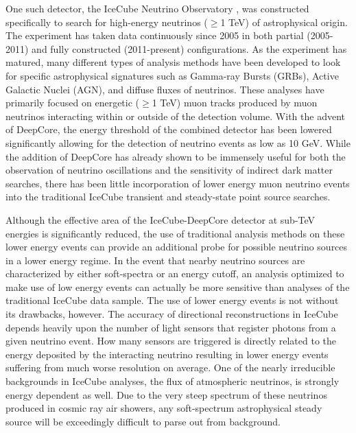 \documentclass{gatech-thesis}
\begin{document}
One such detector, the IceCube Neutrino Observatory \cite{2006APh....26..155I}, was constructed specifically to search for high-energy neutrinos ($\geq$1 TeV) of astrophysical origin. The experiment has taken data continuously since 2005 in both partial (2005-2011) and fully constructed (2011-present) configurations. As the experiment has matured, many different types of analysis methods have been developed to look for specific astrophysical signatures such as Gamma-ray Bursts (GRBs), Active Galactic Nuclei (AGN), and diffuse fluxes of neutrinos. These analyses have primarily focused on energetic ($\geq$1 TeV) muon tracks produced by muon neutrinos interacting within or outside of the detection volume. With the advent of DeepCore\cite{2012APh....35..615A}, the energy threshold of the combined detector has been lowered significantly allowing for the detection of neutrino events as low as 10 GeV. While the addition of DeepCore has already shown to be immensely useful for both the observation of neutrino oscillations and the sensitivity of indirect dark matter searches, there has been little incorporation of lower energy muon neutrino events into the traditional IceCube transient and steady-state point source searches.

Although the effective area of the IceCube-DeepCore detector at sub-TeV energies is significantly reduced, the use of traditional analysis methods on these lower energy events can provide an additional probe for possible neutrino sources in a lower energy regime. In the event that nearby neutrino sources are characterized by either soft-spectra or an energy cutoff, an analysis optimized to make use of low energy events can actually be more sensitive than analyses of the traditional IceCube data sample. The use of lower energy events is not without its drawbacks, however. The accuracy of directional reconstructions in IceCube depends heavily upon the number of light sensors that register photons from a given neutrino event. How many sensors are triggered is directly related to the energy deposited by the interacting neutrino resulting in lower energy events suffering from much worse resolution on average. One of the nearly irreducible backgrounds in IceCube analyses, the flux of atmospheric neutrinos, is strongly energy dependent as well. Due to the very steep spectrum of these neutrinos produced in cosmic ray air showers, any soft-spectrum astrophysical steady source will be exceedingly difficult to parse out from background.
\end{document}
